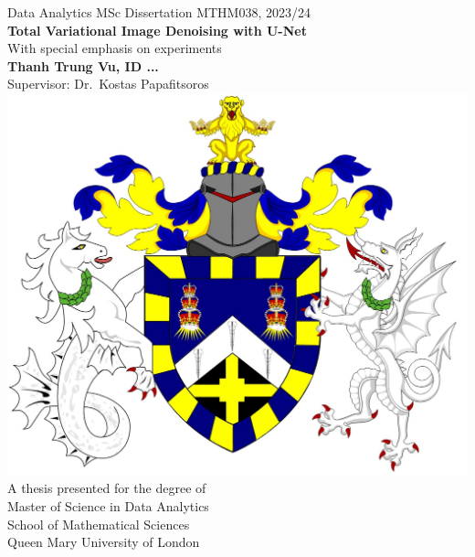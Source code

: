 
\begin{titlepage}
    \begin{center}
            \vspace{-2cm}
    Data Analytics MSc Dissertation MTHM038, 2023/24
            \\
            \Huge
            \textbf{Total Variational Image Denoising with U-Net}
            \\        
            \vspace{0.4cm}
            \LARGE
            With special emphasis on 
            experiments
            \\        
            \vspace{0.4cm}        
            \textbf{Thanh Trung Vu, ID ...}%
            \\
            \large Supervisor: Dr.\ Kostas Papafitsoros
            \\
            \vspace{0.9cm}
            \includegraphics[scale=0.25]{QMCrest.jpg}
            \\
            \vspace{0.9cm}        
            \LARGE 
            A thesis presented for the degree of\\
            Master of Science in 
            Data Analytics
            \\
            \vspace{0.7cm}        
            \Large
            School of Mathematical Sciences\\ 
            Queen Mary University of London \\
        \end{center}
    \end{titlepage}
    